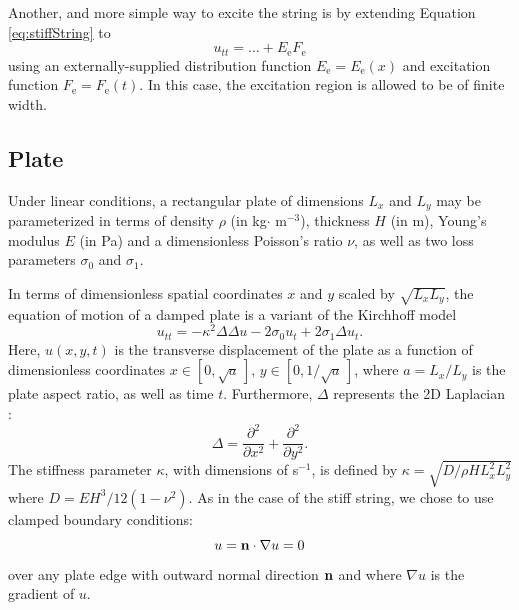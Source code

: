 Another, and more simple way to excite the string is by extending Equation \eqref{eq:stiffString} to
\begin{equation}
    \label{eq:excitedString} u_{tt} = \hdots + E_\text{e}F_\text{e}%
\end{equation}
using an externally-supplied distribution function $E_\text{e} = E_\text{e}(x)$ and excitation function $F_\text{e} = F_\text{e}(t)$. In this case, the excitation region is allowed to be of finite width.

\subsection{Plate}\label{subsec:platePDE}
Under linear conditions, a rectangular plate of dimensions $L_{x}$ and $L_{y}$ may be parameterized in terms of density $\rho$ (in kg$\cdot$ m$^{-3}$), thickness $H$ (in m), Young's modulus $E$ (in Pa) and a dimensionless Poisson's ratio $\nu$, as well as two loss parameters $\sigma_{0}$ and $\sigma_{1}$.%

In terms of dimensionless spatial coordinates $x$ and $y$ scaled by $\sqrt{L_{x}L_{y}}$, the equation of motion of a damped plate is a variant of the Kirchhoff model \cite{Graff}
\begin{equation}\label{eq:platePDE}
    u_{tt} = -\kappa^2 \Delta\Delta u - 2 \sigma_0 u_{t} + 2\sigma_1 \Delta u_{t}.
\end{equation}
Here, $u(x,y,t)$ is the transverse displacement of the plate as a function of dimensionless coordinates $x\in[0, \sqrt{a}\,]$, $y\in[0,1/\sqrt{a}\,]$, where $a = L_{x}/L_{y}$ is the plate aspect ratio, as well as time $t$. Furthermore, $\Delta$ represents the 2D Laplacian \cite{Bilbao2009:NumericalSoundSynthesis}:
\begin{equation}
    \Delta  = \frac{\partial^2}{\partial x^2}+\frac{\partial^2}{\partial y^2}.
\end{equation}
The stiffness parameter $\kappa$, with dimensions of s$^{-1}$, is defined by $\kappa = \sqrt{D/\rho H L_{x}^2L_{y}^2}$ where $D = EH^3/12\left(1-\nu^2\right)$. As in the case of the stiff string, we chose to use clamped boundary conditions:
\begin{equation}
        u = {\bf n}\cdot \nabla u = 0 
\end{equation}
over any plate edge with outward normal direction ${\bf n}$ and where $\nabla u$ is the gradient of $u$. 
